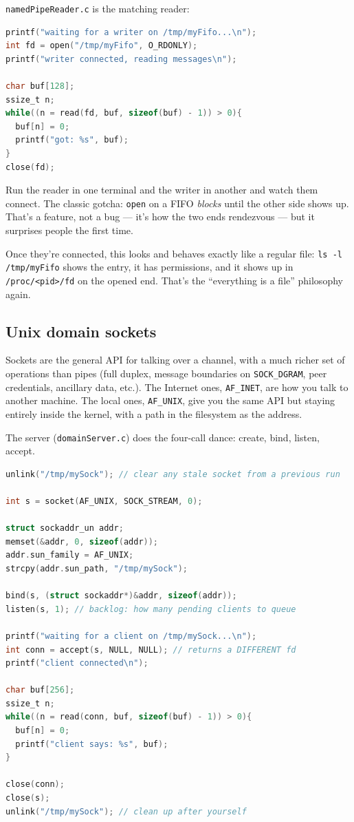 \documentclass[11pt]{article}
\begin{document}
\texttt{namedPipeReader.c} is the matching reader:

\begin{lstlisting}[language=C]
printf("waiting for a writer on /tmp/myFifo...\n");
int fd = open("/tmp/myFifo", O_RDONLY);
printf("writer connected, reading messages\n");

char buf[128];
ssize_t n;
while((n = read(fd, buf, sizeof(buf) - 1)) > 0){
  buf[n] = 0;
  printf("got: %s", buf);
}
close(fd);
\end{lstlisting}

Run the reader in one terminal and the writer in another and watch
them connect. The classic gotcha: \texttt{open} on a FIFO
\emph{blocks} until the other side shows up. That's a feature, not
a bug --- it's how the two ends rendezvous --- but it surprises
people the first time.

Once they're connected, this looks and behaves exactly like a
regular file: \texttt{ls -l /tmp/myFifo} shows the entry, it has
permissions, and it shows up in \texttt{/proc/<pid>/fd} on the
opened end. That's the ``everything is a file'' philosophy again.

\subsection*{Unix domain sockets}

Sockets are the general API for talking over a channel, with a much
richer set of operations than pipes (full duplex, message
boundaries on \texttt{SOCK\_DGRAM}, peer credentials, ancillary
data, etc.). The Internet ones, \texttt{AF\_INET}, are how you talk
to another machine. The local ones, \texttt{AF\_UNIX}, give you the
same API but staying entirely inside the kernel, with a path in the
filesystem as the address.

The server (\texttt{domainServer.c}) does the four-call dance:
create, bind, listen, accept.

\begin{lstlisting}[language=C]
unlink("/tmp/mySock"); // clear any stale socket from a previous run

int s = socket(AF_UNIX, SOCK_STREAM, 0);

struct sockaddr_un addr;
memset(&addr, 0, sizeof(addr));
addr.sun_family = AF_UNIX;
strcpy(addr.sun_path, "/tmp/mySock");

bind(s, (struct sockaddr*)&addr, sizeof(addr));
listen(s, 1); // backlog: how many pending clients to queue

printf("waiting for a client on /tmp/mySock...\n");
int conn = accept(s, NULL, NULL); // returns a DIFFERENT fd
printf("client connected\n");

char buf[256];
ssize_t n;
while((n = read(conn, buf, sizeof(buf) - 1)) > 0){
  buf[n] = 0;
  printf("client says: %s", buf);
}

close(conn);
close(s);
unlink("/tmp/mySock"); // clean up after yourself
\end{lstlisting}
\end{document}
